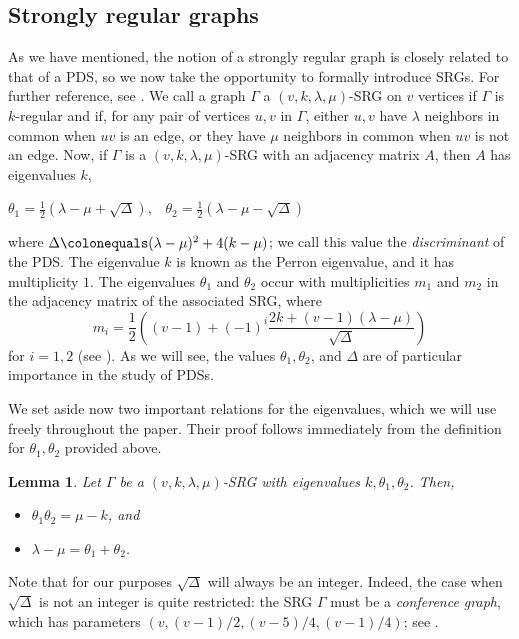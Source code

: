 \documentclass[12pt]{amsproc} %
\newtheorem{lem}[thm]{Lemma}
\theoremstyle{definition}\newtheorem{defn}[thm]{Definition}
\theoremstyle{definition}\newtheorem{rem}[thm]{Remark}
\theoremstyle{definition}\newtheorem{ex}[thm]{Example}
\begin{document}
\subsection{Strongly regular graphs}
As we have mentioned, the notion of a strongly regular graph is closely related to that of a PDS, so we now take the opportunity to formally introduce SRGs. For further reference, see \cite[Chapter 10]{godsil-royle}. We call a graph $\Gamma$ a $(v, k, \lambda, \mu)$-SRG on $v$ vertices if $\Gamma$ is $k$-regular and if, for any pair of vertices $u,v$ in $\Gamma$, either $u, v$ have $\lambda$ neighbors in common when $uv$ is an edge, or they have $\mu$ neighbors in common when $uv$ is not an edge. Now, if $\Gamma$ is a $(v, k, \lambda, \mu)$-SRG with an adjacency matrix $A$, then $A$ has eigenvalues $k$,
	\begin{center}
	$\theta_1 = \frac12(\lambda - \mu + \sqrt\Delta), \;\;\; \theta_2 = \frac12(\lambda - \mu - \sqrt\Delta)$
	\end{center}
\noindent where $\Delta \colonequals (\lambda - \mu)^2 + 4(k - \mu)$; we call this value the {\it discriminant} of the PDS. The eigenvalue $k$ is known as the Perron eigenvalue, and it has multiplicity $1$. The eigenvalues $\theta_1$ and $\theta_2$ occur with multiplicities $m_1$ and $m_2$ in the adjacency matrix of the associated SRG, where
            \[ m_i = \frac{1}{2} \left( (v-1) + (-1)^i \frac{2k + (v-1)(\lambda - \mu)}{\sqrt{\Delta}}\right)\]
             for $i = 1, 2$ (see \cite[Chapter 10]{godsil-royle}).
As we will see, the values $\theta_1, \theta_2$, and $\Delta$ are of particular importance in the study of PDSs.

We set aside now two important relations for the eigenvalues, which we will use freely throughout the paper. Their proof follows immediately from the definition for $\theta_1, \theta_2$ provided above.

\begin{lem}\label{eigen-relations}
Let $\Gamma$ be a $(v, k, \lambda, \mu)$-SRG with eigenvalues $k, \theta_1, \theta_2$. Then,
	\begin{itemize}
		\item[(i)] $\theta_1\theta_2 = \mu - k$, and
		\item[(ii)] $\lambda - \mu = \theta_1 + \theta_2$.
	\end{itemize}
\end{lem}

Note that for our purposes $\sqrt\Delta$ will always be an integer. Indeed, the case when $\sqrt\Delta$ is not an integer is quite restricted: the SRG $\Gamma$ must be a \textit{conference graph}, which has parameters $(v, (v-1)/2, (v-5)/4, (v-1)/4)$; see \cite[Lemmas 10.3.2, 10.3.3]{godsil-royle}. 
\end{document}
